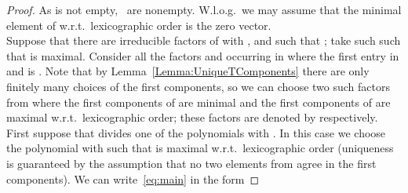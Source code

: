 \documentclass[a4paper]{sig-alternate}
\begin{document}
\begin{proof}
As  is not empty, ~are nonempty. W.l.o.g.\ we may assume that the minimal element of  w.r.t.\ lexicographic order is the zero vector.\\
Suppose that there are irreducible factors  of  with ,  and  such that ; take such  such that  is maximal.
Consider all the factors  and  occurring in  where the first entry in  and  is . Note that by Lemma~\ref{Lemma:UniqueTComponents} there are only finitely many choices of the first  components, so we can choose two such factors from  where the first  components of  are minimal and the first  components of  are maximal w.r.t.\ lexicographic order; these factors are denoted by  respectively.\\
 First suppose that  divides one of the polynomials  with .
In this case we choose the polynomial  with  such that  is maximal w.r.t.\ lexicographic order (uniqueness is guaranteed by the assumption that no two elements from  agree in the first  components). We can write~\eqref{eq:main} in the form


\end{proof}
\end{document}
